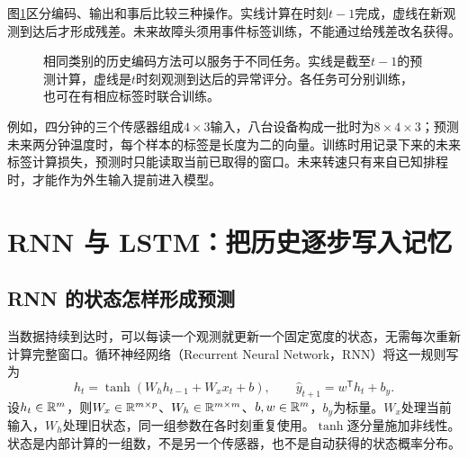 图\ref{fig:sequence-tasks}区分编码、输出和事后比较三种操作。实线计算在时刻$t-1$完成，虚线在新观测到达后才形成残差。未来故障头须用事件标签训练，不能通过给残差改名获得。
\begin{figure}[htbp]
\centering
{}
\caption{相同类别的历史编码方法可以服务于不同任务。实线是截至$t-1$的预测计算，虚线是$t$时刻观测到达后的异常评分。各任务可分别训练，也可在有相应标签时联合训练。}
\label{fig:sequence-tasks}
\end{figure}

例如，四分钟的三个传感器组成$4\times3$输入，八台设备构成一批时为$8\times4\times3$；预测未来两分钟温度时，每个样本的标签是长度为二的向量。训练时用记录下来的未来标签计算损失，预测时只能读取当前已取得的窗口。未来转速只有来自已知排程时，才能作为外生输入提前进入模型。

\section{RNN 与 LSTM：把历史逐步写入记忆}
\subsection{RNN 的状态怎样形成预测}
当数据持续到达时，可以每读一个观测就更新一个固定宽度的状态，无需每次重新计算完整窗口。循环神经网络（Recurrent Neural Network，RNN）将这一规则写为
\begin{equation}
 h_t=\tanh(W_hh_{t-1}+W_xx_t+b),\qquad
 \hat y_{t+1}=w^{\mathsf T}h_t+b_y.
 \label{eq:sequence-rnn-predict}
\end{equation}
设$h_t\in\mathbb{R}^m$，则$W_x\in\mathbb{R}^{m\times p}$、$W_h\in\mathbb{R}^{m\times m}$、$b,w\in\mathbb{R}^m$，$b_y$为标量。$W_x$处理当前输入，$W_h$处理旧状态，同一组参数在各时刻重复使用。$\tanh$逐分量施加非线性。状态是内部计算的一组数，不是另一个传感器，也不是自动获得的状态概率分布。


